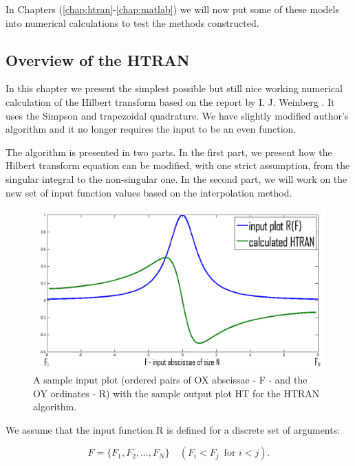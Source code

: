 \documentclass[12pt,twoside,a4paper]{article}
\numberwithin{equation}{subsection}
\numberwithin{figure}{subsection}
\begin{document}
In Chapters (\ref{chap:htran}-\ref{chap:matlab}) we will now put some of these models into numerical calculations to test the methods constructed.


\subsection{Overview of the HTRAN} \label{chap:htran_overview} 

In this chapter we present the simplest possible but still nice working numerical calculation of the Hilbert transform based on the report by I. J. Weinberg \cite{weinberg_hilbert}. It uses the Simpson and trapezoidal quadrature. We have slightly modified author's algorithm and it no longer requires the input to be an even function.

The algorithm is presented in two parts. In the first part, we present how the Hilbert transform equation can be modified, with one strict assumption, from the singular integral to the non-singular one. In the second part, we will work on the new set of input function values based on the interpolation method.

\begin{figure}
	\includegraphics[width=150mm]{img/htran_illustration.png}
	\caption{A sample input plot (ordered pairs of OX abscissae - F - and the OY ordinates - R) with the sample output plot HT for the HTRAN algorithm. \label{fig:htran_illustration}} 
\end{figure}

We assume that the input function R is defined for a discrete set of arguments:
 
\begin{equation} \label{eq:htran_arguments}
	F = \{ F_1, F_2, \ldots, F_N \} \quad (F_i < F_j \, \text{ for } i < j) . 
\end{equation}
\end{document}
